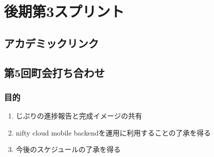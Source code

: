\section{後期第3スプリント}
\subsection{アカデミックリンク}
\subsection{第5回町会打ち合わせ}
\subsubsection{目的}
\begin{enumerate}
    \item じぷりの進捗報告と完成イメージの共有
    \item nifty cloud mobile backendを運用に利用することの了承を得る
    \item 今後のスケジュールの了承を得る
\end{enumerate}

